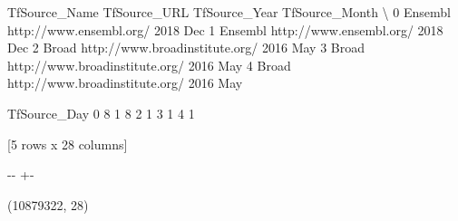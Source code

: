 \documentclass[letterpaper,10pt,english]{sphinxmanual}
\newlength\nbsphinxcodecellspacing
\begin{document}
{\begin{sphinxVerbatim}[commandchars=\\\{\}]
  TfSource\_Name                    TfSource\_URL TfSource\_Year TfSource\_Month  \textbackslash{}
0       Ensembl         http://www.ensembl.org/          2018            Dec
1       Ensembl         http://www.ensembl.org/          2018            Dec
2         Broad  http://www.broadinstitute.org/          2016            May
3         Broad  http://www.broadinstitute.org/          2016            May
4         Broad  http://www.broadinstitute.org/          2016            May

  TfSource\_Day
0            8
1            8
2            1
3            1
4            1

[5 rows x 28 columns]
\end{sphinxVerbatim}
}

{
\begin{sphinxVerbatim}[commandchars=\\\{\}]
\llap{\color{nbsphinxin}[14]:\,\hspace{\fboxrule}\hspace{\fboxsep}}
\end{sphinxVerbatim}
}

{

\kern-\sphinxverbatimsmallskipamount\kern-\baselineskip
\kern+\FrameHeightAdjust\kern-\fboxrule
\vspace{\nbsphinxcodecellspacing}

\begin{sphinxVerbatim}[commandchars=\\\{\}]
\llap{\color{nbsphinxout}[14]:\,\hspace{\fboxrule}\hspace{\fboxsep}}(10879322, 28)
\end{sphinxVerbatim}
}
\end{document}
